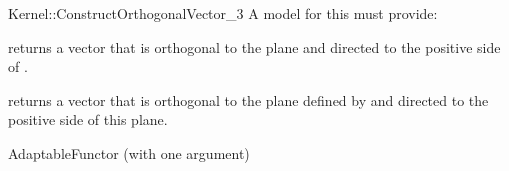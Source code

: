 \begin{ccRefFunctionObjectConcept}{Kernel::ConstructOrthogonalVector_3}
A model for this must provide:


{returns a vector that is orthogonal to the plane  and directed
 to the positive side of .}

{returns a vector that is orthogonal to the plane defined by 
  and directed
 to the positive side of this plane.}

\ccRefines
AdaptableFunctor (with one argument)

\ccSeeAlso
{} \\
\\
\end{ccRefFunctionObjectConcept}
